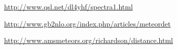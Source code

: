 \documentclass[12pt,a4paper,oneside]{article}
\begin{document}
\begin{thebibliography}{99}
\href{http://www.qsl.net/dl4yhf/spectra1.html}{http://www.qsl.net/dl4yhf/spectra1.html}

\href{http://www.gb2nlo.org/index.php/articles/meteordet}{http://www.gb2nlo.org/index.php/articles/meteordet}

\href{http://www.amsmeteors.org/richardson/distance.html}{http://www.amsmeteors.org/richardson/distance.html}




\end{thebibliography}
\end{document}
